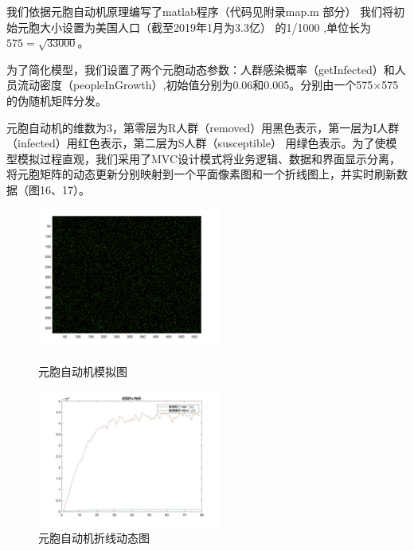 \documentclass[UTF8]{ctexart}
\begin{document}
我们依据元胞自动机原理编写了matlab程序（代码见附录map.m 部分）
我们将初始元胞大小设置为美国人口（截至2019年1月为3.3亿\cite{bib8}）
的1/1000 ,单位长为$575=\sqrt{33000}$。
\\
\par 
为了简化模型，我们设置了两个元胞动态参数：人群感染概率（getInfected）和人员流动密度（peopleInGrowth）,初始值分别为0.06和0.005。分别由一个575$\times$575的伪随机矩阵分发。
\par
元胞自动机的维数为3，第零层为R人群（removed）用黑色表示，第一层为I人群（infected）用红色表示，第二层为S人群（susceptible） 用绿色表示。为了使模型模拟过程直观，我们采用了MVC设计模式将业务逻辑、数据和界面显示分离，将元胞矩阵的动态更新分别映射到一个平面像素图和一个折线图上，并实时刷新数据（图16、17）。
\\ 
\begin{figure}[htbp]
    \centering
    \begin{minipage}[t]{0.48\textwidth}
    \centering
    \includegraphics[width=6cm]{20.png}
    \caption{元胞自动机模拟图}
    \end{minipage}
    \begin{minipage}[t]{0.48\textwidth}
    \centering
    \includegraphics[width=6cm]{raw.jpg}
    \caption{元胞自动机折线动态图}
    \end{minipage}
    \end{figure}
\end{document}

